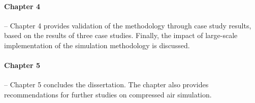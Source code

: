 	\paragraph{Chapter 4} \hspace{0.4cm} -- Chapter 4 provides validation of the methodology through case study results, based on the results of three case studies. Finally, the impact of large-scale implementation of the simulation methodology is discussed.
	\paragraph{Chapter 5} \hspace{0.4cm} -- Chapter 5 concludes the dissertation. The chapter also provides recommendations for further studies on compressed air simulation.
